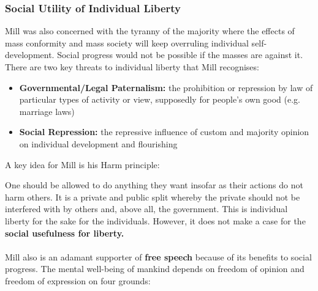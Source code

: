 \documentclass[12pt, letterpaper]{article}
\begin{document}
\subsubsection{Social Utility of Individual Liberty}
Mill was also concerned with the tyranny of the majority where the effects of mass conformity and mass society will keep overruling individual self-development. Social progress would not be possible if the masses are against it. There are two key threats to individual liberty that Mill recognises:
\begin{itemize}
	\item \textbf{Governmental/Legal Paternalism:} the prohibition or repression by law of particular types of activity or view, supposedly for people's own good (e.g. marriage laws)
	\item \textbf{Social Repression:} the repressive influence of custom and majority opinion on individual development and flourishing
\end{itemize}
A key idea for Mill is his Harm principle:
\begin{center}
\end{center}
One should be allowed to do anything they want insofar as their actions do not harm others. It is a private and public split whereby the private should not be interfered with by others and, above all, the government. This is individual liberty for the sake for the individuals. However, it does not make a case for the \textbf{social usefulness for liberty.}\\\\
Mill also is an adamant supporter of \textbf{free speech} because of its benefits to social progress. The mental well-being of mankind depends on freedom of opinion and freedom of expression on four grounds:
\end{document}
